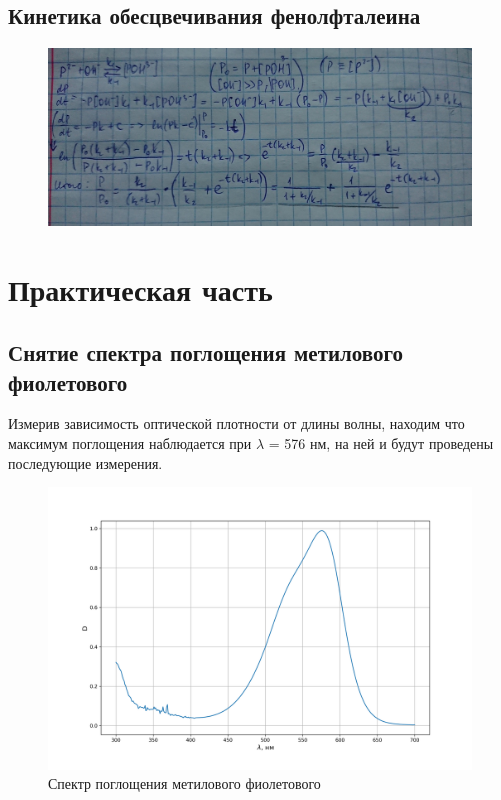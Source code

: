 \documentclass[a4paper, 12pt]{article}
\begin{document}
\subsection{Кинетика обесцвечивания фенолфталеина}
\begin{figure}[h!]
    \begin{center}
    \includegraphics[width=1\textwidth]{вывод.jpg}
    \end{center}
\end{figure}
\newpage


\section{Практическая часть}

\subsection{Снятие спектра поглощения метилового фиолетового}
Измерив зависимость оптической плотности от длины волны, находим что максимум поглощения наблюдается при $\lambda$ = 576 нм, на ней и будут проведены последующие измерения.
 \begin{figure}[h!]
    \begin{center}
    \includegraphics[width=1\textwidth]{fig1.png}
    \end{center}
    \caption{Спектр поглощения метилового фиолетового}
\end{figure}
\end{document}
